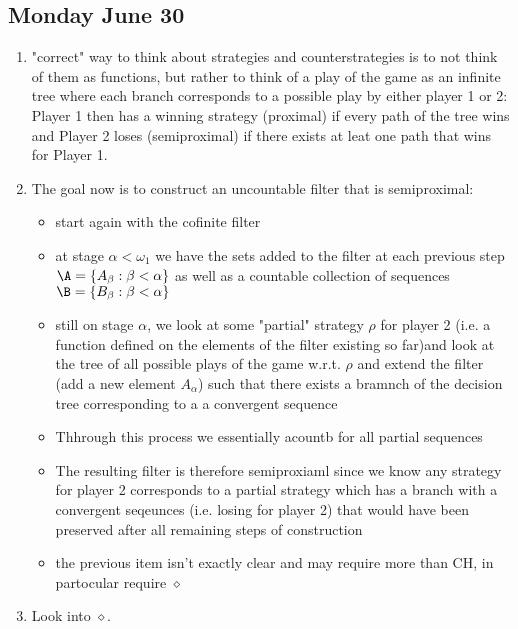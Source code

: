 \documentclass{article}
\begin{document}
\subsection*{Monday June 30}
\begin{enumerate}
    \item "correct" way to think about strategies and counterstrategies is to not think of them as functions, but rather to think of a play of the game as an infinite tree where each branch corresponds to a possible play by either player 1 or 2: Player 1 then has a winning strategy (proximal) if every path of the tree wins and Player 2 loses (semiproximal) if there exists at leat one path that wins for Player 1.
    \item The goal now is to construct an uncountable filter that is semiproximal: 
    \begin{itemize}
        \item start again with the cofinite filter
        \item at stage \(\alpha < \omega_1\) we have the sets added to the filter at each previous step \(\A = \{A_{\beta}: \beta < \alpha\}\) as well as a countable collection of sequences \(\B = \{B_{\beta} : \beta < \alpha\}\) 
        \item still on stage \(\alpha\), we look at some "partial" strategy \(\rho\) for player 2 (i.e. a function defined on the elements of the filter existing so far)and look at the tree of all possible plays of the game w.r.t. \(\rho\)  and extend the filter (add a new element \(A_{\alpha}\)) such that there exists a bramnch of the decision tree corresponding to a a convergent sequence
        \item Thhrough this process we essentially acountb for all partial sequences
        \item The resulting filter is therefore semiproxiaml since we know any strategy for player 2 corresponds to a partial strategy which has a branch with a convergent seqeunces (i.e. losing for player 2) that would have been preserved after all remaining steps of construction
        \item the previous item isn't exactly clear and may require more than CH, in partocular require \(\diamond\)
    \end{itemize}
    \item Look into \(\diamond\).
\end{enumerate}
\end{document}

